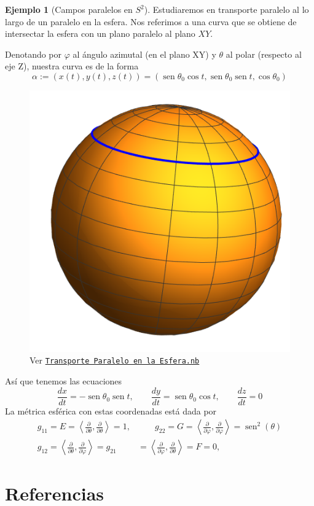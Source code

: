 \documentclass[spanish]{book}
\theoremstyle{definition}
\newtheorem*{ejem}{Ejemplo}
\DeclareMathOperator{\sen}{sen}
\begin{document}
	\begin{ejem}[Campos paralelos en $S^2$]
		Estudiaremos en transporte paralelo al lo largo de un paralelo en la esfera. Nos referimos a una curva que se obtiene de intersectar la esfera con un plano paralelo al plano $XY$.
		
		Denotando por $\varphi$ al ángulo azimutal (en el plano XY) y $\theta$ al polar (respecto al eje Z), nuestra curva es de la forma
		\[\alpha:=(x(t),y(t),z(t))=(\sen\theta_0\cos t,\sen\theta_0\sen t,\cos\theta_0)\]
		\begin{figure}[H]
			\centering
			\includegraphics[width=0.4\linewidth]{fig14}
			\caption{Ver \href{}{\texttt{Transporte Paralelo en la Esfera.nb}}}
			\label{fig:fig14}
		\end{figure}
		
		Así que tenemos las ecuaciones
		\[\frac{dx}{dt}=-\sen\theta_0\sen t,\qquad\frac{dy}{dt}=\sen\theta_0\cos t,\qquad\frac{dz}{dt}=0\]
	La métrica esférica con estas coordenadas está dada por
		\begin{align*}
		g_{11}=E=\left\langle \frac{\partial}{\partial \theta},\frac{\partial}{\partial \theta}\right\rangle=1,&\qquad g_{22}=G=\left\langle \frac{\partial}{\partial \varphi},\frac{\partial}{\partial \varphi}\right\rangle=\sen^2(\theta)\\
		g_{12}=\left\langle \frac{\partial}{\partial \theta},\frac{\partial}{\partial \varphi}\right\rangle=g_{21}&=\left\langle \frac{\partial}{\partial \varphi},\frac{\partial}{\partial \theta}\right\rangle=F=0,
	\end{align*}

	\end{ejem}
	
	\chapter{Referencias}
	\printbibliography[heading=none]
	
\end{document}
